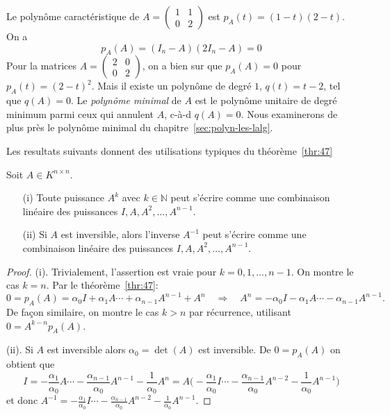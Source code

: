 \begin{example}
Le polyn\^ome caract\'eristique de $A = \left( \begin{array}{cc} 1 & 1 \\ 0 & 2
\end{array} \right)$ est $p_A(t) = (1-t)(2-t)$. On a 
\[
 p_A(A) = (I_n-A)(2I_n-A) = 0 
\]
Pour la matrices $A = \left( \begin{array}{cc} 2 & 0 \\ 0 & 2 \end{array}
\right)$, on a bien sur que $p_A(A) = 0$ pour $p_A(t) = (2-t)^2$. Mais il existe un polyn\^ome de degr\'e $1$, $q(t) = t-2$, tel que $q(A) = 0$. Le \emph{polyn\^ome minimal} de $A$
est le polyn\^ome unitaire de degr\'e minimum parmi ceux qui annulent $A$, c-\`a-d $q(A) = 0$. Nous examinerons de plus près le polyn{\^o}me minimal du chapitre~\ref{sec:polyn-les-lalg}.
\end{example}

Les resultats suivants donnent des utilisations typiques du théorème~\ref{thr:47}
\begin{corollary} Soit $A \in K^{n ×n}$.
\begin{enumerate}
\item[(i)] Toute puissance $A^k$ avec $k∈ℕ$ peut s'\'ecrire comme une combinaison lin\'eaire des puissances $I,A,A^2,\ldots,A^{n-1}$.
\item[(ii)] Si $A$ est inversible, alors l'inverse $A^{-1}$ peut s'\'ecrire comme une combinaison lin\'eaire des puissances $I,A,A^2,\ldots,A^{n-1}$.
\end{enumerate}
\end{corollary}

\begin{proof}
 (i). Trivialement, l'assertion est vraie pour $k = 0,1,\ldots,n-1$.
On montre le cas $k = n$. Par le théorème~\ref{thr:47}:
\[
 0 = p_A(A) = \alpha_0 I + \alpha_1 A  \cdots + \alpha_{n-1} A^{n-1} + A^n \quad
\Rightarrow \quad A^n = 
-\alpha_0 I - \alpha_1 A  \cdots - \alpha_{n-1} A^{n-1}.
\]
De fa\c{c}on similaire, on montre le cas $k>n$ par r\'ecurrence, utilisant $0 = A^{k-n} p_A(A)$.

(ii). Si $A$ est inversible alors $\alpha_0 = \det(A)$ est inversible. De $0 = p_A(A)$ on obtient que
\[
  I = -\frac{\alpha_1}{\alpha_0} A  \cdots -\frac{\alpha_{n-1}}{\alpha_0}
A^{n-1} -\frac{1}{\alpha_0} A^n = A \Big( -\frac{\alpha_1}{\alpha_0} I  \cdots
-\frac{\alpha_{n-1}}{\alpha_0} A^{n-2} -\frac{1}{\alpha_0} A^{n-1} \Big)
\]
et donc $A^{-1} = -\frac{\alpha_1}{\alpha_0} I  \cdots
-\frac{\alpha_{n-1}}{\alpha_0} A^{n-2} -\frac{1}{\alpha_0} A^{n-1}$.
\end{proof}



